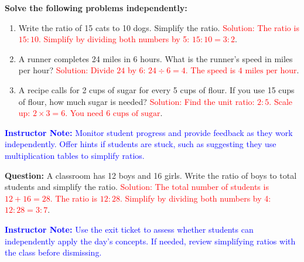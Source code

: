 \documentclass[12pt]{article}
\begin{document}
\begin{tcolorbox}[colframe=black!60, colback=white, 
coltitle=black, colbacktitle=black!15, fonttitle=\bfseries\Large, 
title=Independent Practice, halign title=center, left=10pt, right=10pt, top=10pt, bottom=15pt]
\textbf{Solve the following problems independently:}
\begin{enumerate}[itemsep=3em]
    \item Write the ratio of 15 cats to 10 dogs. Simplify the ratio.  
    \textcolor{red}{Solution: The ratio is \( 15:10 \). Simplify by dividing both numbers by 5: \( 15:10 = 3:2 \)}.  

    \item A runner completes 24 miles in 6 hours. What is the runner's speed in miles per hour?  
    \textcolor{red}{Solution: Divide \( 24 \) by \( 6 \): \( 24 \div 6 = 4 \). The speed is \( 4 \text{ miles per hour} \)}.  

    \item A recipe calls for 2 cups of sugar for every 5 cups of flour. If you use 15 cups of flour, how much sugar is needed?  
    \textcolor{red}{Solution: Find the unit ratio: \( 2:5 \). Scale up: \( 2 \times 3 = 6 \). You need \( 6 \text{ cups of sugar} \)}.  
\end{enumerate}
\textcolor{blue}{\textbf{Instructor Note:} Monitor student progress and provide feedback as they work independently. Offer hints if students are stuck, such as suggesting they use multiplication tables to simplify ratios.}
\end{tcolorbox}

\begin{tcolorbox}[colframe=black!60, colback=white, 
coltitle=black, colbacktitle=black!15, fonttitle=\bfseries\Large, 
title=Exit Ticket, halign title=center, left=10pt, right=10pt, top=10pt, bottom=15pt]
\textbf{Question:} A classroom has 12 boys and 16 girls. Write the ratio of boys to total students and simplify the ratio.  
\textcolor{red}{Solution: The total number of students is \( 12 + 16 = 28 \). The ratio is \( 12:28 \). Simplify by dividing both numbers by 4: \( 12:28 = 3:7 \)}. 

\textcolor{blue}{\textbf{Instructor Note:} Use the exit ticket to assess whether students can independently apply the day’s concepts. If needed, review simplifying ratios with the class before dismissing.}
\end{tcolorbox}
\end{document}
